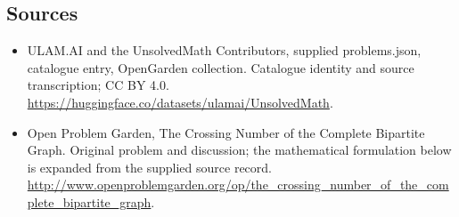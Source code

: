 \documentclass[11pt,a4paper]{article}
\begin{document}
\subsection{Sources}
\begin{itemize}
\item[S1] ULAM.AI and the UnsolvedMath Contributors, supplied problems.json, catalogue entry, OpenGarden collection. Catalogue identity and source transcription; CC BY 4.0.
\url{https://huggingface.co/datasets/ulamai/UnsolvedMath}.
\item[S2] Open Problem Garden, The Crossing Number of the Complete Bipartite Graph. Original problem and discussion; the mathematical formulation below is expanded from the supplied source record.
\url{http://www.openproblemgarden.org/op/the_crossing_number_of_the_complete_bipartite_graph}.

\end{itemize}
\end{document}
